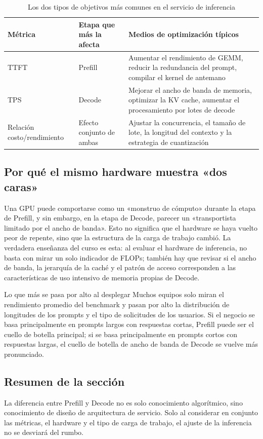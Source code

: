 \documentclass[a4paper]{article}
\begin{document}
\begin{table}[H]
\centering
\caption{Los dos tipos de objetivos más comunes en el servicio de inferencia}
\begin{tabular}{p{3.2cm}p{4.8cm}p{4.5cm}}
\toprule
Métrica & Etapa que más la afecta & Medios de optimización típicos \\
\midrule
TTFT & Prefill & Aumentar el rendimiento de GEMM, reducir la redundancia del prompt, compilar el kernel de antemano \\
TPS & Decode & Mejorar el ancho de banda de memoria, optimizar la KV cache, aumentar el procesamiento por lotes de decode \\
Relación costo/rendimiento & Efecto conjunto de ambas & Ajustar la concurrencia, el tamaño de lote, la longitud del contexto y la estrategia de cuantización \\
\bottomrule
\end{tabular}
\end{table}

\subsection{Por qué el mismo hardware muestra «dos caras»}
Una GPU puede comportarse como un «monstruo de cómputo» durante la etapa de Prefill, y sin embargo, en la etapa de Decode, parecer un «transportista limitado por el ancho de banda». Esto no significa que el hardware se haya vuelto peor de repente, sino que la estructura de la carga de trabajo cambió. La verdadera enseñanza del curso es esta: al evaluar el hardware de inferencia, no basta con mirar un solo indicador de FLOPs; también hay que revisar si el ancho de banda, la jerarquía de la caché y el patrón de acceso corresponden a las características de uso intensivo de memoria propias de Decode.

\begin{knowledgebox}{Lo que más se pasa por alto al desplegar}
Muchos equipos solo miran el rendimiento promedio del benchmark y pasan por alto la distribución de longitudes de los prompts y el tipo de solicitudes de los usuarios. Si el negocio se basa principalmente en prompts largos con respuestas cortas, Prefill puede ser el cuello de botella principal; si se basa principalmente en prompts cortos con respuestas largas, el cuello de botella de ancho de banda de Decode se vuelve más pronunciado.
\end{knowledgebox}

\subsection{Resumen de la sección}
La diferencia entre Prefill y Decode no es solo conocimiento algorítmico, sino conocimiento de diseño de arquitectura de servicio. Solo al considerar en conjunto las métricas, el hardware y el tipo de carga de trabajo, el ajuste de la inferencia no se desviará del rumbo.
\end{document}
